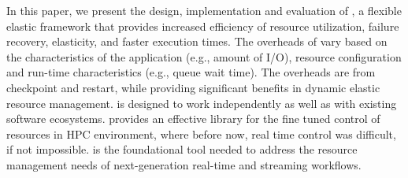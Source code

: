 In this paper, we present the design, implementation and evaluation of
\systemname, a flexible elastic framework that provides increased efficiency
of resource utilization, failure recovery, elasticity, and faster
execution times. The overheads of \systemname vary based on the
characteristics of the application (e.g., amount of I/O), resource
configuration and run-time characteristics (e.g., queue wait
time). The overheads are from checkpoint and restart, while providing
significant benefits in dynamic elastic resource
management. \systemname is designed to work independently as well as
with existing software ecosystems. \systemname provides an effective
library for the fine tuned control of resources in HPC environment,
where before now, real time control was difficult, if not
impossible. \systemname is the foundational tool needed to address the
resource management needs of next-generation real-time and streaming
workflows.




